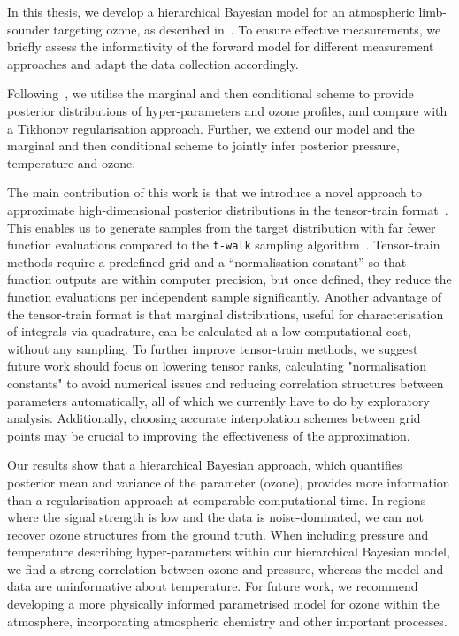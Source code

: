 In this thesis, we develop a hierarchical Bayesian model for an atmospheric limb-sounder targeting ozone, as described in~\cite{mipas2000handbook}.
To ensure effective measurements, we briefly assess the informativity of the forward model for different measurement approaches and adapt the data collection accordingly.

Following~\cite{fox2016fast}, we utilise the marginal and then conditional scheme to provide posterior distributions of hyper-parameters and ozone profiles, and compare with a Tikhonov regularisation approach.
Further, we extend our model and the marginal and then conditional scheme to jointly infer posterior pressure, temperature and ozone.

The main contribution of this work is that we introduce a novel approach to approximate high-dimensional posterior distributions in the tensor-train format~\cite{cui2022deep}.
This enables us to generate samples from the target distribution with far fewer function evaluations compared to the \texttt{t-walk} sampling algorithm~\cite{christen2010general}.
Tensor-train methods require a predefined grid and a ``normalisation constant'' so that function outputs are within computer precision, but once defined, they reduce the function evaluations per independent sample significantly.
Another advantage of the tensor-train format is that marginal distributions, useful for characterisation of integrals via quadrature, can be calculated at a low computational cost, without any sampling.
To further improve tensor-train methods, we suggest future work should focus on lowering tensor ranks, calculating "normalisation constants" to avoid numerical issues and reducing correlation structures between parameters automatically, all of which we currently have to do by exploratory analysis.
Additionally, choosing accurate interpolation schemes between grid points may be crucial to improving the effectiveness of the approximation.

Our results show that a hierarchical Bayesian approach, which quantifies posterior mean and variance of the parameter (ozone), provides more information than a regularisation approach at comparable computational time.
In regions where the signal strength is low and the data is noise-dominated, we can not recover ozone structures from the ground truth.
When including pressure and temperature describing hyper-parameters within our hierarchical Bayesian model, we find a strong correlation between ozone and pressure, whereas the model and data are uninformative about temperature.
For future work, we recommend developing a more physically informed parametrised model for ozone within the atmosphere, incorporating atmospheric chemistry and other important processes.